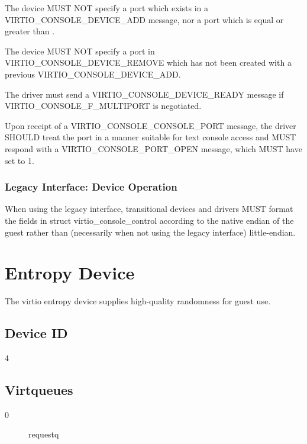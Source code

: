 The device MUST NOT specify a port which exists in a
VIRTIO_CONSOLE_DEVICE_ADD message, nor a port which is equal or
greater than .

The device MUST NOT specify a port in VIRTIO_CONSOLE_DEVICE_REMOVE
which has not been created with a previous VIRTIO_CONSOLE_DEVICE_ADD.


The driver must send a VIRTIO_CONSOLE_DEVICE_READY message if
VIRTIO_CONSOLE_F_MULTIPORT is negotiated.

Upon receipt of a VIRTIO_CONSOLE_CONSOLE_PORT message, the driver
SHOULD treat the port in a manner suitable for text console access
and MUST respond with a VIRTIO_CONSOLE_PORT_OPEN message, which MUST
have  set to 1.

\subsubsection{Legacy Interface: Device Operation}\label{sec:Device Types / Console Device / Device Operation / Legacy Interface: Device Operation}
When using the legacy interface, transitional devices and drivers
MUST format the fields in struct virtio_console_control
according to the native endian of the guest rather than
(necessarily when not using the legacy interface) little-endian.


\section{Entropy Device}\label{sec:Device Types / Entropy Device}

The virtio entropy device supplies high-quality randomness for
guest use.

\subsection{Device ID}\label{sec:Device Types / Entropy Device / Device ID}
  4

\subsection{Virtqueues}\label{sec:Device Types / Entropy Device / Virtqueues}
\begin{description}
\item[0] requestq
\end{description}

